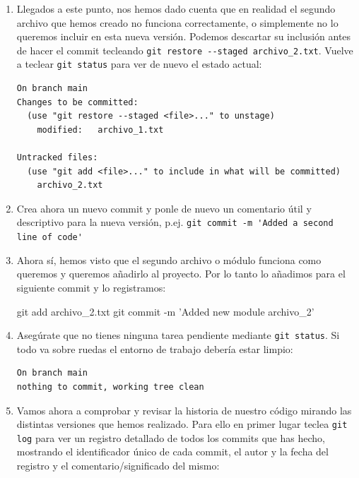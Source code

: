 \documentclass[a4paper,11pt]{report}
\newcommand{\cverb}{\Verb}
\begin{document}
\begin{enumerate}
    \item Llegados a este punto, nos hemos dado cuenta que en realidad el segundo archivo que hemos creado no funciona correctamente, o simplemente no lo queremos incluir en esta nueva versión. Podemos descartar su inclusión antes de hacer el commit tecleando \cverb+git restore --staged archivo_2.txt+. Vuelve a teclear \cverb+git status+ para ver de nuevo el estado actual:
    
    \begin{lstlisting}[style=custom]
On branch main
Changes to be committed:
  (use "git restore --staged <file>..." to unstage)
	modified:   archivo_1.txt

Untracked files:
  (use "git add <file>..." to include in what will be committed)
	archivo_2.txt
    \end{lstlisting}
    
    \item Crea ahora un nuevo commit y ponle de nuevo un comentario útil y descriptivo para la nueva versión, p.ej. \cverb+git commit -m 'Added a second line of code'+
    
    \item Ahora sí, hemos visto que el segundo archivo o módulo funciona como queremos y queremos añadirlo al proyecto. Por lo tanto lo añadimos para el siguiente commit y lo registramos:
    \begin{cverbatim}
git add archivo_2.txt
git commit -m 'Added new module archivo_2'
    \end{cverbatim}
    
    \item Asegúrate que no tienes ninguna tarea pendiente mediante \cverb+git status+. Si todo va sobre ruedas el entorno de trabajo debería estar limpio:
    
    \begin{lstlisting}[style=custom]
On branch main
nothing to commit, working tree clean
    \end{lstlisting}
    
    \item Vamos ahora a comprobar y revisar la historia de nuestro código mirando las distintas versiones que hemos realizado. Para ello en primer lugar teclea \cverb+git log+ para ver un registro detallado de todos los commits que has hecho, mostrando el identificador único de cada commit, el autor y la fecha del registro y el comentario/significado del mismo:

    \begin{lstlisting}[style=custom]


\end{lstlisting}
\end{enumerate}
\end{document}
